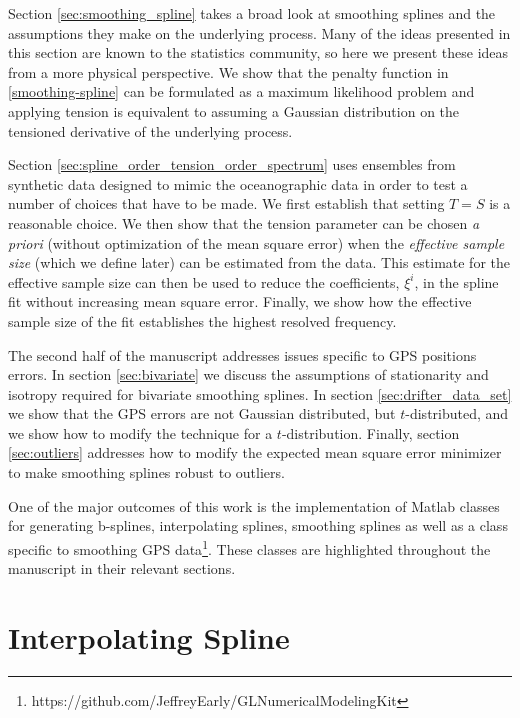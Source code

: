 \documentclass{ametsoc}
\begin{document}
Section \ref{sec:smoothing_spline} takes a broad look at smoothing splines and the assumptions they make on the underlying process. Many of the ideas presented in this section are known to the statistics community, so here we present these ideas from a more physical perspective. %
We show that the penalty function in \eqref{smoothing-spline} can be formulated as a maximum likelihood problem and applying tension is equivalent to assuming a Gaussian distribution on the tensioned derivative of the underlying process.

Section \ref{sec:spline_order_tension_order_spectrum} uses ensembles from synthetic data designed to mimic the oceanographic data in order to test a number of choices that have to be made. We first establish that setting $T=S$ is a reasonable choice. We then show that the tension parameter can be chosen \emph{a priori} (without optimization of the mean square error) when the {\em effective sample size} (which we define later) can be estimated from the data. This estimate for the effective sample size can then be used to reduce the coefficients, $\xi^i$, in the spline fit without increasing mean square error. Finally, we show how the effective sample size of the fit establishes the highest resolved frequency.

The second half of the manuscript addresses issues specific to GPS positions errors. In section \ref{sec:bivariate} we discuss the assumptions of stationarity and isotropy required for bivariate smoothing splines. In section \ref{sec:drifter_data_set} we show that the GPS errors are not Gaussian distributed, but $t$-distributed, and we show how to modify the technique for a $t$-distribution. Finally, section \ref{sec:outliers} addresses how to modify the expected mean square error minimizer to make smoothing splines robust to outliers.

One of the major outcomes of this work is the implementation of Matlab classes for generating b-splines, interpolating splines, smoothing splines as well as a class specific to smoothing GPS data\footnote{https://github.com/JeffreyEarly/GLNumericalModelingKit}. These classes are highlighted throughout the manuscript in their relevant sections.

%
\section{Interpolating Spline}
\label{sec:interpolation}
%
\end{document}

